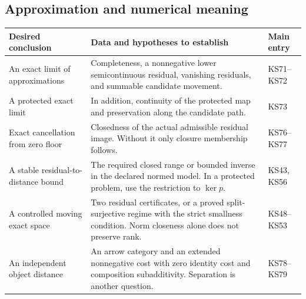\subsection{Approximation and numerical meaning}
\begin{longtable}{@{}p{.24\linewidth}p{.48\linewidth}p{.21\linewidth}@{}}
\toprule Desired conclusion & Data and hypotheses to establish & Main entry\\\midrule\endhead
An exact limit of approximations & Completeness, a nonnegative lower semicontinuous residual, vanishing residuals, and summable candidate movement. & KS71--KS72\\[4pt]
A protected exact limit & In addition, continuity of the protected map and preservation along the candidate path. & KS73\\[4pt]
Exact cancellation from zero floor & Closedness of the actual admissible residual image. Without it only closure membership follows. & KS76--KS77\\[4pt]
A stable residual-to-distance bound & The required closed range or bounded inverse in the declared normed model. In a protected problem, use the restriction to $\ker p$. & KS43, KS56\\[4pt]
A controlled moving exact space & Two residual certificates, or a proved split-surjective regime with the strict smallness condition. Norm closeness alone does not preserve rank. & KS48--KS53\\[4pt]
An independent object distance & An arrow category and an extended nonnegative cost with zero identity cost and composition subadditivity. Separation is another question. & KS78--KS79\\
\bottomrule
\end{longtable}


